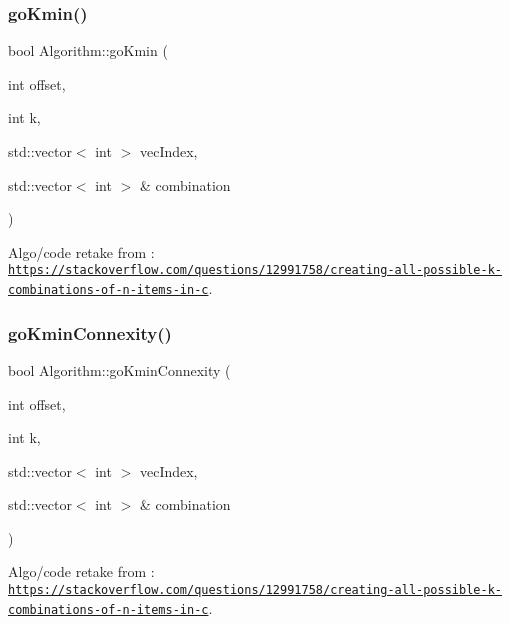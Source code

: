\subsubsection{\texorpdfstring{go\+Kmin()}{goKmin()}}
{\footnotesize\ttfamily bool Algorithm\+::go\+Kmin (\begin{DoxyParamCaption}\item[{int}]{offset,  }\item[{int}]{k,  }\item[{std\+::vector$<$ int $>$}]{vec\+Index,  }\item[{std\+::vector$<$ int $>$ \&}]{combination }\end{DoxyParamCaption})}



Algo/code retake from \+: \href{https://stackoverflow.com/questions/12991758/creating-all-possible-k-combinations-of-n-items-in-c}{\tt https\+://stackoverflow.\+com/questions/12991758/creating-\/all-\/possible-\/k-\/combinations-\/of-\/n-\/items-\/in-\/c}. 

\mbox{\label{struct_algorithm_a58bead487e29355d8d69ea68f598d6f1}} 
\subsubsection{\texorpdfstring{go\+Kmin\+Connexity()}{goKminConnexity()}}
{\footnotesize\ttfamily bool Algorithm\+::go\+Kmin\+Connexity (\begin{DoxyParamCaption}\item[{int}]{offset,  }\item[{int}]{k,  }\item[{std\+::vector$<$ int $>$}]{vec\+Index,  }\item[{std\+::vector$<$ int $>$ \&}]{combination }\end{DoxyParamCaption})}



Algo/code retake from \+: \href{https://stackoverflow.com/questions/12991758/creating-all-possible-k-combinations-of-n-items-in-c}{\tt https\+://stackoverflow.\+com/questions/12991758/creating-\/all-\/possible-\/k-\/combinations-\/of-\/n-\/items-\/in-\/c}. 

\mbox{\label{struct_algorithm_a4527b9ab55d27dcaf015181bb3e1b99a}} 
